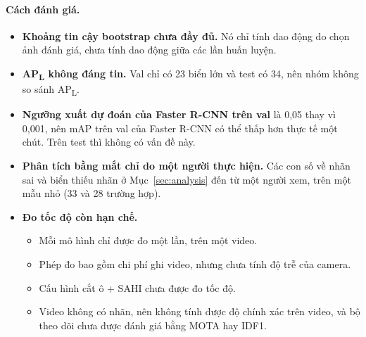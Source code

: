 \paragraph{Cách đánh giá.}
\begin{itemize}
\item \textbf{Khoảng tin cậy bootstrap chưa đầy đủ.} Nó chỉ tính dao động do chọn ảnh đánh giá, chưa tính dao động giữa các lần huấn luyện.
\item \textbf{AP\textsubscript{L} không đáng tin.} Val chỉ có 23 biển lớn và test có 34, nên nhóm không so sánh AP\textsubscript{L}.
\item \textbf{Ngưỡng xuất dự đoán của Faster R-CNN trên val} là 0,05 thay vì 0,001, nên mAP trên val của Faster R-CNN có thể thấp hơn thực tế một chút. Trên test thì không có vấn đề này.
\item \textbf{Phân tích bằng mắt chỉ do một người thực hiện.} Các con số về nhãn sai và biển thiếu nhãn ở Mục~\ref{sec:analysis} đến từ một người xem, trên một mẫu nhỏ (33 và 28 trường hợp).
\item \textbf{Đo tốc độ còn hạn chế.}
  \begin{itemize}
  \item Mỗi mô hình chỉ được đo một lần, trên một video.
  \item Phép đo bao gồm chi phí ghi video, nhưng chưa tính độ trễ của camera.
  \item Cấu hình cắt ô + SAHI chưa được đo tốc độ.
  \item Video không có nhãn, nên không tính được độ chính xác trên video, và bộ theo dõi chưa được đánh giá bằng MOTA hay IDF1.
  \end{itemize}
\end{itemize}
